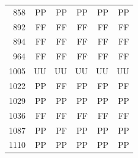 \begin{table}[!htbp]
\begin{tabular*}{\textwidth}{@{\extracolsep{\fill}}rrrrrr}
858 & PP & PP & PP & PP & PP\\
892 & FF & FF & FF & FF & FF\\
894 & FF & FF & FF & FF & FF\\
964 & FF & FF & FF & FF & FF\\
1005 & UU & UU & UU & UU & UU\\
1022 & PP & FF & FP & FP & PF\\
1029 & PP & PP & PP & PP & PP\\
1036 & FF & FF & FF & FF & FF\\
1087 & PP & PF & PP & PP & PP\\
1110 & PP & PP & PP & PP & PP\\
\bottomrule\end{tabular*}\end{table}
